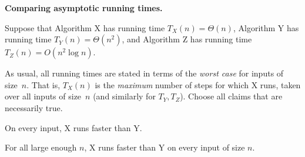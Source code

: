 \documentclass[11pt,addpoints]{exam}
\begin{document}
\begin{questions}

  \question[5] \textbf{Comparing asymptotic running times.}

  Suppose that Algorithm X has running time $T_{X}(n) = \Theta(n)$, Algorithm Y has running time $T_{Y}(n) = \Theta(n^2)$, and Algorithm Z has running time $T_{Z}(n) = O(n^{2} \log n)$.

  As usual, all running times are stated in terms of the \emph{worst case} for inputs of size~$n$.
  That is, $T_{X}(n)$ is the \emph{maximum} number of steps for which X runs, taken over all inputs of size~$n$ (and similarly for $T_{Y}, T_{Z}$).
  Choose all claims that are necessarily true.

\checkboxchar{\raisebox{-.2em}{\Large$\square$}}
\checkedchar{\raisebox{-.2em}{\Large$\blacksquare$}}
  \begin{checkboxes}
    \choice On every input, X runs faster than Y.

    \choice For all large enough $n$, X runs faster than Y on every input of size $n$.


\end{checkboxes}
\end{questions}
\end{document}
